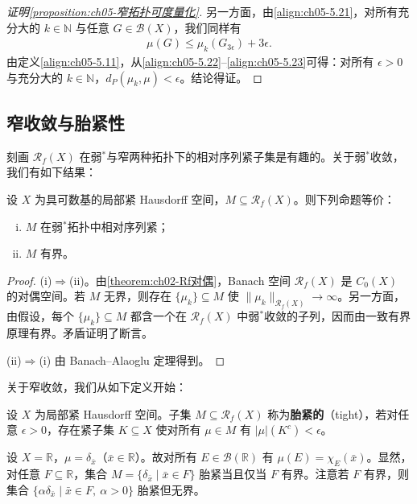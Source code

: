 \documentclass[../../main.tex]{subfiles}%
\begin{document}
\begin{proof}[证明\cref{proposition:ch05-窄拓扑可度量化}]
另一方面，由\eqref{align:ch05-5.21}，对所有充分大的 $k\in\mathbb{N}$ 与任意 $G\in\mathscr{B}(X)$，我们同样有
\begin{align}
\mu(G)\leqslant\mu_k(G_{3\epsilon})+3\epsilon.\label{align:ch05-5.23}
\end{align}
由定义\eqref{align:ch05-5.11}，从\eqref{align:ch05-5.22}–\eqref{align:ch05-5.23}可得：对所有 $\epsilon>0$ 与充分大的 $k\in\mathbb{N}$，$d_P(\mu_k,\mu)<\epsilon$。结论得证。
\end{proof}

\subsection{窄收敛与胎紧性}

刻画 $\mathscr{R}_f(X)$ 在弱$^*$与窄两种拓扑下的相对序列紧子集是有趣的。关于弱$^*$收敛，我们有如下结果：

\begin{theorem}\label{theorem:ch05-弱星紧性}
\label{theorem:ch05-弱星紧}
设 $X$ 为具可数基的局部紧 Hausdorff 空间，$M\subseteq\mathscr{R}_f(X)$。则下列命题等价：
\begin{enumerate}[(i)]
\item\label{item:ch05-wstar-i} $M$ 在弱$^*$拓扑中相对序列紧；
\item\label{item:ch05-wstar-ii} $M$ 有界。
\end{enumerate}
\end{theorem}

\begin{proof}
(i)$\Rightarrow$(ii)。由\cref{theorem:ch02-Rf对偶}，Banach 空间 $\mathscr{R}_f(X)$ 是 $C_0(X)$ 的对偶空间。若 $M$ 无界，则存在 $\{\mu_k\}\subseteq M$ 使 $\|\mu_k\|_{\mathscr{R}_f(X)}\to\infty$。另一方面，由假设，每个 $\{\mu_k\}\subseteq M$ 都含一个在 $\mathscr{R}_f(X)$ 中弱$^*$收敛的子列，因而由一致有界原理有界。矛盾证明了断言。

(ii)$\Rightarrow$(i) 由 Banach–Alaoglu 定理得到。
\end{proof}

关于窄收敛，我们从如下定义开始：

\begin{definition}\label{definition:ch05-胎紧}
设 $X$ 为局部紧 Hausdorff 空间。子集 $M\subseteq\mathscr{R}_f(X)$ 称为\textbf{胎紧的}（tight），若对任意 $\epsilon>0$，存在紧子集 $K\subseteq X$ 使对所有 $\mu\in M$ 有 $|\mu|(K^c)<\epsilon$。
\end{definition}

\begin{example}\label{example:ch05-胎紧}
设 $X=\mathbb{R}$，$\mu=\delta_{\bar{x}}$（$\bar{x}\in\mathbb{R}$）。故对所有 $E\in\mathscr{B}(\mathbb{R})$ 有 $\mu(E)=\chi_E(\bar{x})$。显然，对任意 $F\subseteq\mathbb{R}$，集合 $M=\{\delta_{\bar{x}}\mid\bar{x}\in F\}$ 胎紧当且仅当 $F$ 有界。注意若 $F$ 有界，则集合 $\{\alpha\delta_{\bar{x}}\mid\bar{x}\in F,\ \alpha>0\}$ 胎紧但无界。
\end{example}
\end{document}
